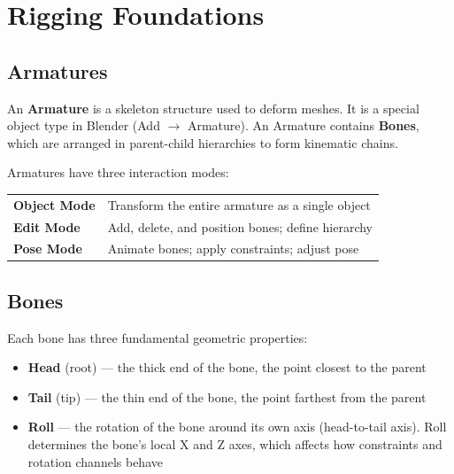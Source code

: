 \section{Rigging Foundations}
\label{sec:rigging}

\subsection{Armatures}
\label{subsec:armatures}

An \textbf{Armature} is a skeleton structure used to deform meshes. It is a special object type in Blender (Add $\rightarrow$ Armature). An Armature contains \textbf{Bones}, which are arranged in parent-child hierarchies to form kinematic chains.

Armatures have three interaction modes:

\begin{center}
\begin{tabularx}{\textwidth}{L{3cm}X}
\toprule
{}
 &  \\
\midrule
\textbf{Object Mode} & Transform the entire armature as a single object \\
\textbf{Edit Mode} & Add, delete, and position bones; define hierarchy \\
\textbf{Pose Mode} & Animate bones; apply constraints; adjust pose \\
\bottomrule
\end{tabularx}
\end{center}

\subsection{Bones}
\label{subsec:bones}

Each bone has three fundamental geometric properties:

\begin{itemize}[leftmargin=2em]
  \item \textbf{Head} (root) --- the thick end of the bone, the point closest to the parent
  \item \textbf{Tail} (tip) --- the thin end of the bone, the point farthest from the parent
  \item \textbf{Roll} --- the rotation of the bone around its own axis (head-to-tail axis). Roll determines the bone's local X and Z axes, which affects how constraints and rotation channels behave
\end{itemize}

